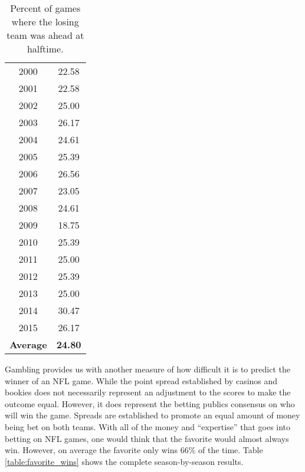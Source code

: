 \documentclass[11pt]{article}
\begin{document}
\begin{table}[!htb]
\begin{center}
\scriptsize
\begin{tabular}{|c|c|}
\hline
2000 & 22.58\\
2001 & 22.58\\
2002 & 25.00\\
2003 & 26.17\\
2004 & 24.61\\
2005 & 25.39\\
2006 & 26.56\\
2007 & 23.05\\
2008 & 24.61\\
2009 & 18.75\\
2010 & 25.39\\
2011 & 25.00\\
2012 & 25.39\\
2013 & 25.00\\
2014 & 30.47\\
2015 & 26.17\\
\hline
\textbf{Average} & \textbf{24.80}\\
\hline
\end{tabular}
\caption{Percent of games where the losing team was ahead at halftime.}\label{table:halftime_flip_flop}
\end{center}
\end{table}

Gambling provides us with another measure of how difficult it is to predict the winner of an NFL game. While the point spread established by casinos and bookies does not necessarily represent an adjustment to the scores to make the outcome equal. However, it does represent the betting publics consensus on who will win the game. Spreads are established to promote an equal amount of money being bet on both teams. With all of the money and ``expertise'' that goes into betting on NFL games, one would think that the favorite would almost always win. However, on average the favorite only wins 66\% of the time. Table \ref{table:favorite_wins} shows the complete season-by-season results.
\end{document}
